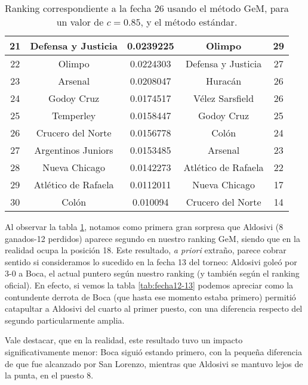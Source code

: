 \begin{table}[H]
\begin{flushright}
\begin{tabular}{| c | c | c || c | c |}
		21 & Defensa y Justicia & 0.0239225 & Olimpo & 29\\ \hline
		22 & Olimpo & 0.0224303 & Defensa y Justicia & 27 \\ \hline
		23 & Arsenal & 0.0208047 & Huracán & 26 \\ \hline
		24 & Godoy Cruz & 0.0174517 & Vélez Sarsfield & 26 \\ \hline
		25 & Temperley & 0.0158447 & Godoy Cruz & 25 \\ \hline
		26 & Crucero del Norte & 0.0156778 & Colón & 24 \\ \hline
		27 & Argentinos Juniors & 0.0153485 & Arsenal & 23 \\ \hline
		28 & Nueva Chicago & 0.0142273 & Atlético de Rafaela & 22 \\ \hline
		29 & Atlético de Rafaela & 0.0112011 & Nueva Chicago & 17 \\ \hline
		30 & Colón & 0.010094 & Crucero del Norte & 14 \\ \hline
	\end{tabular}
	\end{flushright}
	\caption{\footnotesize Ranking correspondiente a la fecha 26 usando el método GeM, para un valor de $c = 0.85$, y el método estándar.}
	\label{tab:fecha26}
\end{table}

Al observar la tabla \ref{tab:fecha26}, notamos como primera gran sorpresa que Aldosivi (8 ganados-12 perdidos) aparece segundo en nuestro ranking GeM, siendo que en la realidad ocupa la posición 18. Este resultado, \emph{a priori} extraño, parece cobrar sentido si consideramos lo sucedido en la fecha 13 del torneo: Aldosivi goleó por 3-0 a Boca, el actual puntero según nuestro ranking (y también según el ranking oficial). En efecto, si vemos la tabla \ref{tab:fecha12-13} podemos apreciar como la contundente derrota de Boca (que hasta ese momento estaba primero) permitió catapultar a Aldosivi del cuarto al primer puesto, con una diferencia respecto del segundo particularmente amplia. 

Vale destacar, que en la realidad, este resultado tuvo un impacto significativamente menor: Boca siguió estando primero, con la pequeña diferencia de que fue alcanzado por San Lorenzo, mientras que Aldosivi se mantuvo lejos de la punta, en el puesto 8.

